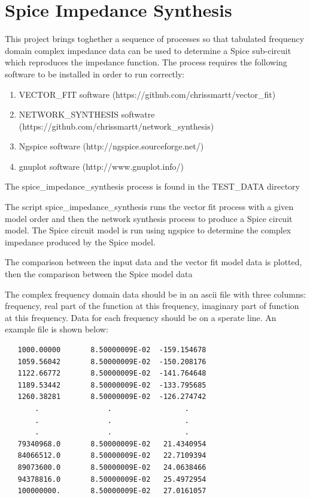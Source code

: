 \section{Spice Impedance Synthesis}\label{spice_impedance_synthesis}

This project brings toghether a sequence of processes so that tabulated frequency domain complex impedance data can be used to determine a Spice sub-circuit which reproduces the impedance function. The process requires the following software to be installed in order to run correctly:

\begin{enumerate}

\item VECTOR\_FIT software (https://github.com/chrissmartt/vector\_fit)

\item NETWORK\_SYNTHESIS softwatre (https://github.com/chrissmartt/network\_synthesis)

\item Ngspice software (http://ngspice.sourceforge.net/)

\item gnuplot software (http://www.gnuplot.info/)

\end{enumerate}

The spice\_impedance\_synthesis process is found in the TEST\_DATA directory

The script spice\_impedance\_synthesis runs the vector fit process with a given model order
and then the network synthesis process to produce a Spice circuit model. The Spice circuit model
is run using ngspice to determine the complex impedance produced by the Spice model.

The comparison between the input data and the vector fit
model data is plotted, then the comparison between the Spice model data 

The complex frequency domain data should be in an ascii file with three columns: frequency, real part of the function at this frequency, imaginary part of function at this frequency. Data for each frequency should be on a sperate line. An example file is shown below:

\begin{verbatim}
   1000.00000       8.50000009E-02  -159.154678         
   1059.56042       8.50000009E-02  -150.208176         
   1122.66772       8.50000009E-02  -141.764648         
   1189.53442       8.50000009E-02  -133.795685         
   1260.38281       8.50000009E-02  -126.274742         
       .                .                 .
       .                .                 .
       .                .                 .
   79340968.0       8.50000009E-02   21.4340954         
   84066512.0       8.50000009E-02   22.7109394         
   89073600.0       8.50000009E-02   24.0638466         
   94378816.0       8.50000009E-02   25.4972954         
   100000000.       8.50000009E-02   27.0161057         
\end{verbatim}

